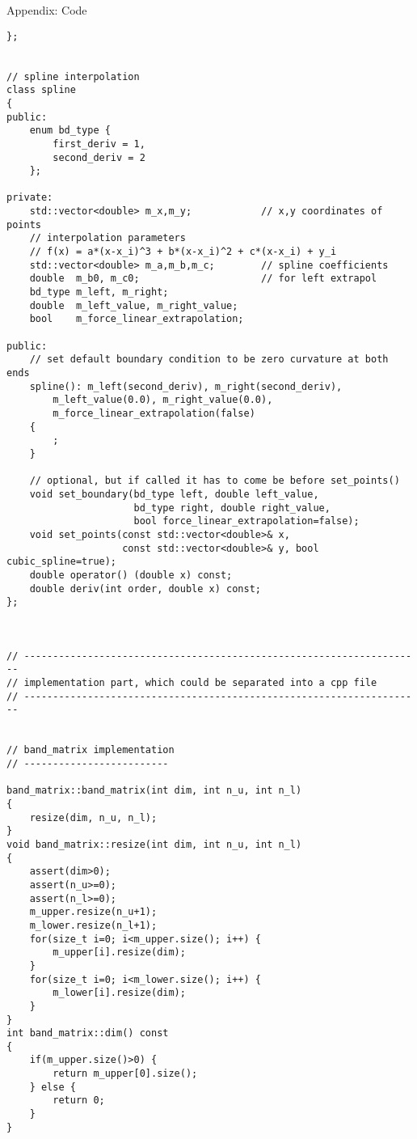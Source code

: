 \documentclass[letterpaper,12pt]{article}
\begin{document}
\begin{section}{Appendix: Code}
\begin{lstlisting}
};


// spline interpolation
class spline
{
public:
    enum bd_type {
        first_deriv = 1,
        second_deriv = 2
    };

private:
    std::vector<double> m_x,m_y;            // x,y coordinates of points
    // interpolation parameters
    // f(x) = a*(x-x_i)^3 + b*(x-x_i)^2 + c*(x-x_i) + y_i
    std::vector<double> m_a,m_b,m_c;        // spline coefficients
    double  m_b0, m_c0;                     // for left extrapol
    bd_type m_left, m_right;
    double  m_left_value, m_right_value;
    bool    m_force_linear_extrapolation;

public:
    // set default boundary condition to be zero curvature at both ends
    spline(): m_left(second_deriv), m_right(second_deriv),
        m_left_value(0.0), m_right_value(0.0),
        m_force_linear_extrapolation(false)
    {
        ;
    }

    // optional, but if called it has to come be before set_points()
    void set_boundary(bd_type left, double left_value,
                      bd_type right, double right_value,
                      bool force_linear_extrapolation=false);
    void set_points(const std::vector<double>& x,
                    const std::vector<double>& y, bool cubic_spline=true);
    double operator() (double x) const;
    double deriv(int order, double x) const;
};



// ---------------------------------------------------------------------
// implementation part, which could be separated into a cpp file
// ---------------------------------------------------------------------


// band_matrix implementation
// -------------------------

band_matrix::band_matrix(int dim, int n_u, int n_l)
{
    resize(dim, n_u, n_l);
}
void band_matrix::resize(int dim, int n_u, int n_l)
{
    assert(dim>0);
    assert(n_u>=0);
    assert(n_l>=0);
    m_upper.resize(n_u+1);
    m_lower.resize(n_l+1);
    for(size_t i=0; i<m_upper.size(); i++) {
        m_upper[i].resize(dim);
    }
    for(size_t i=0; i<m_lower.size(); i++) {
        m_lower[i].resize(dim);
    }
}
int band_matrix::dim() const
{
    if(m_upper.size()>0) {
        return m_upper[0].size();
    } else {
        return 0;
    }
}



\end{lstlisting}
\end{section}
\end{document}
